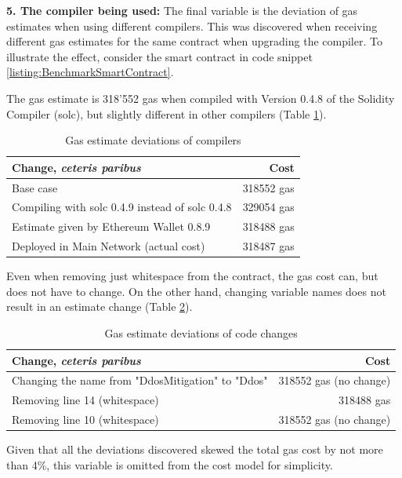 \textbf{5. The compiler being used:} The final variable is the deviation of gas estimates when using different compilers. This was discovered when receiving different gas estimates for the same contract when upgrading the compiler. To illustrate the effect, consider the smart contract in code snippet \ref{listing:BenchmarkSmartContract}.



The gas estimate is 318'552 gas when compiled with Version 0.4.8 of the Solidity Compiler (solc), but slightly different in other compilers (Table \ref{table:GasDeviations}).

\begin{table}
  \begin{center}
      \begin{tabular}{ l | r }
        \hline
        \textbf{Change, \textit{ceteris paribus}} & \textbf{Cost} \\ \hline
        Base case & 318552 gas \\ \hline
        Compiling with solc 0.4.9 instead of solc 0.4.8 & 329054 gas \\ \hline
        Estimate given by Ethereum Wallet 0.8.9 & 318488 gas \\ \hline
        Deployed in Main Network (actual cost) & 318487 gas \\
        \hline
      \end{tabular}
      \caption{Gas estimate deviations of compilers}
      \label{table:GasDeviations}
  \end{center}
\end{table}

Even when removing just whitespace from the contract, the gas cost can, but does not have to change. On the other hand, changing variable names does not result in an estimate change (Table \ref{table:GasDeviationsCode}).

\begin{table}
  \begin{center}
    \begin{tabular}{ l | r }
      \hline
      \textbf{Change, \textit{ceteris paribus}} & \textbf{Cost} \\ \hline
      Changing the name from "DdosMitigation" to "Ddos" & 318552 gas (no change) \\ \hline
      Removing line 14 (whitespace) & 318488 gas \\ \hline
      Removing line 10 (whitespace) & 318552 gas (no change) \\
      \hline
    \end{tabular}
    \caption{Gas estimate deviations of code changes}
    \label{table:GasDeviationsCode}
  \end{center}
\end{table}
Given that all the deviations discovered skewed the total gas cost by not more than 4\%, this variable is omitted from the cost model for simplicity.

